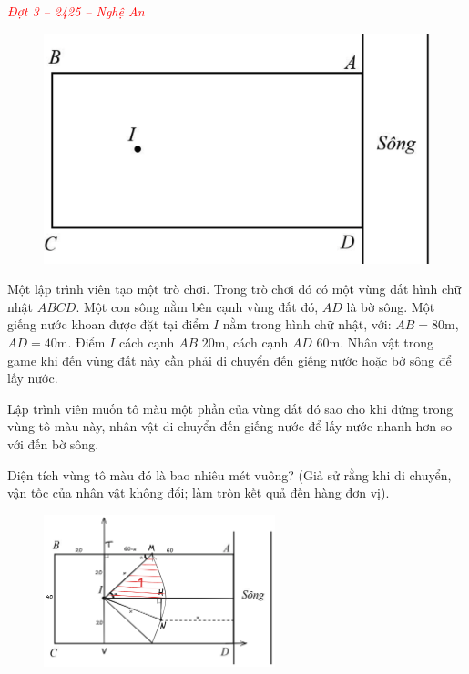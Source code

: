 \documentclass[twoside,final]{hcmut-report}
\newcommand{\exercise}[1]{\begin{exercisebox}#1\end{exercisebox}}
\begin{document}
\exercise{
    \textcolor{red}{\textit{Đợt 3 -- 2425 -- Nghệ An}}

    \begin{figure}
        \centering
        \includegraphics*[width=1.03\linewidth]{images/Nghệ An 2025 - Đợt 3/NgheAn25-5.png}
    \end{figure}

    Một lập trình viên tạo một trò chơi. Trong trò chơi đó có một vùng đất hình chữ nhật $ABCD$. Một con sông nằm bên cạnh vùng đất đó, $AD$ là bờ sông. Một giếng nước khoan được đặt tại điểm $I$ nằm trong hình chữ nhật, với:
    $AB = 80$m, $AD = 40$m. Điểm $I$ cách cạnh $AB$ $20$m, cách cạnh $AD$ $60$m. Nhân vật trong game khi đến vùng đất này cần phải di chuyển đến giếng nước hoặc bờ sông để lấy nước.

    Lập trình viên muốn tô màu một phần của vùng đất đó sao cho khi đứng trong vùng tô màu này, nhân vật di chuyển đến giếng nước để lấy nước nhanh hơn so với đến bờ sông.

    Diện tích vùng tô màu đó là bao nhiêu mét vuông? (Giả sử rằng khi di chuyển, vận tốc của nhân vật không đổi; làm tròn kết quả đến hàng đơn vị).
}
\begin{figure}[H]
    \centering
    \includegraphics[width=0.6\textwidth]{images/Nghệ An 2025 - Đợt 3/NgheAn25-6.png}
\end{figure}
\end{document}
